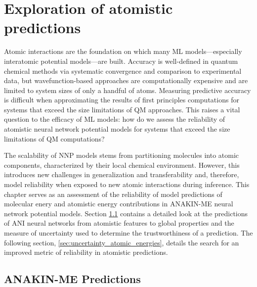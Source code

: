 \chapter{Exploration of atomistic predictions}
\label{chapter2}

Atomic interactions are the foundation on which many ML models---especially interatomic potential models---are built.
Accuracy is well-defined in quantum chemical methods via systematic convergence and comparison to experimental data, but wavefunction-based approaches are computationally expensive and are limited to system sizes of only a handful of atoms.
Measuring predictive accuracy is difficult when approximating the results of first principles computations for systems that exceed the size limitations of QM approaches.
This raises a vital question to the efficacy of ML models: how do we assess the reliability of atomistic neural network potential models for systems that exceed the size limitations of QM computations?

The scalability of NNP models stems from partitioning molecules into atomic components, characterized by their local chemical environment.
However, this introduces new challenges in generalization and transferability and, therefore, model reliability when exposed to new atomic interactions during inference.
This chapter serves as an assessment of the reliability of model predictions of molecular enery and atomistic energy contributions in ANAKIN-ME neural network potential models.
Section \ref{sec:ANI_predictions} contains a detailed look at the predictions of ANI neural networks from atomistic features to global properties and the measure of uncertainty used to determine the trustworthiness of a prediction.
The following section, \ref{sec:uncertainty_atomic_energies}, details the search for an improved metric of reliability in atomistic predictions.

\section{ANAKIN-ME Predictions}
\label{sec:ANI_predictions}


